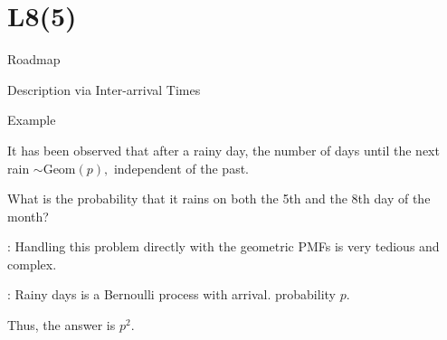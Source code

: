 \section{L8(5)}
\begin{frame}{Roadmap}

\plitemsep 0.2in

\bce[(1)]

\item {}
\item {}

\item {}

\item {}

\item {}

\item {}

  \ece

\end{frame}

\begin{frame}{Description via Inter-arrival Times}


\end{frame}

\begin{frame}{Example}

  \plitemsep 0.1in

  \bci
  
\item It has been observed that after a rainy day, the number of days
  until the next rain $\sim \text{Geom}(p),$ independent of the past. 
  
\item<2-> \question What is the probability that it rains on both the 5th and the
  8th day of the month?

\item<3-> : Handling this problem directly with the geometric
  PMFs is very tedious and complex.

\item<4-> : Rainy days is a  Bernoulli process with arrival.
  probability $p.$

\item<5-> Thus, the answer is $p^2.$

  \eci

\end{frame}

